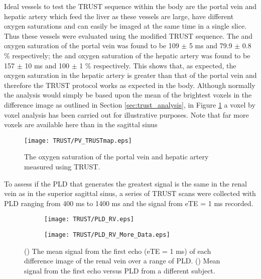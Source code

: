 Ideal vessels to test the \ac{TRUST} sequence within the body are the portal vein and hepatic artery which feed the liver as these vessels are large, have different oxygen saturations and can easily be imaged at the same time in a single slice. Thus these vessels were evaluated using the modified \ac{TRUST} sequence. The \ttwo and oxygen saturation of the portal vein was found to be 109 $\pm$ 5 ms and 79.9 $\pm$ 0.8 \% respectively; the \ttwo and oxygen saturation of the hepatic artery was found to be 157 $\pm$ 10 ms and 100 $\pm$ 1 \% respectively. This shows that, as expected, the oxygen saturation in the hepatic artery is greater than that of the portal vein and therefore the \ac{TRUST} protocol works as expected in the body. Although normally the analysis would simply be based upon the mean of the brightest voxels in the difference image as outlined in Section \ref{sec:trust_analysis}, in Figure \ref{fig:pv_TRUST} a voxel by voxel analysis has been carried out for illustrative purposes. Note that far more voxels are available here than in the sagittal sinus

\begin{figure}[h]
	\centering
	\texttt{[image: TRUST/PV\_TRUSTmap.eps]}
	\caption{The oxygen saturation of the portal vein and hepatic artery measured using \ac{TRUST}.}
	\label{fig:pv_TRUST}	
\end{figure}
To assess if the \ac{PLD} that generates the greatest signal is the same in the renal vein as in the superior sagittal sinus, a series of \ac{TRUST} scans were collected with \ac{PLD} ranging from 400 ms to 1400 ms and the signal from \ac{eTE} = 1 ms recorded.

\begin{figure}[H]
	\centering
	\begin{subfigure}[c]{0.47\textwidth}
		\centering
		\texttt{[image: TRUST/PLD\_RV.eps]}
		\caption{}
		\label{fig:Sig_vs_PLD_RV}
	\end{subfigure}
	\hfill
	\begin{subfigure}[c]{0.47\textwidth}
		\centering
		\texttt{[image: TRUST/PLD\_RV\_More\_Data.eps]}
		\caption{}
		\label{fig:Sig_vs_PLD_RV_more}
	\end{subfigure}
	\caption{() The mean signal from the first echo (\ac{eTE} = 1 ms) of each difference image of the renal vein over a range of \ac{PLD}. () Mean signal from the first echo versus \ac{PLD} from a different subject. }
\end{figure}

